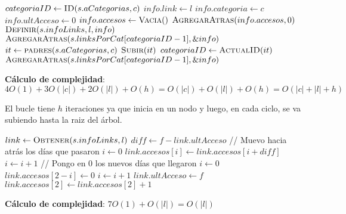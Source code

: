 \documentclass[10pt, a4paper]{article}
\let\TipoVariable=\texttt
\let\ModificadorArgumento=\textbf
\newcommand{\tab}{\hspace*{7mm}}
\newcommand{\In}[2]{\ModificadorArgumento{in} \ensuremath{#1}\,: \TipoVariable{#2}\xspace}
\newcommand{\Inout}[2]{\ModificadorArgumento{in/out} \ensuremath{#1}\,: \TipoVariable{#2}\xspace}
\begin{document}
\begin{algorithm}[H]
\caption*{iAgregarLink(\Inout{s}{LinkLinkIt}, \In{l}{link}, \In{c}{categoria})}
\begin{algorithmic}[1]
	\State $categoriaID \gets \Call{ID}{s.aCategorias, c}$
	\Statex
	\State $info.link \gets l$
	\State $info.categoria \gets c$
    \State $info.ultAcceso \gets 0$
    \State $info.accesos \gets \Call{Vacia}{\null}$
        \State $\Call{AgregarAtras}{info.accesos, 0}$
    \EndFor
	\State $\Call{Definir}{s.infoLinks, l, info}$
    \State $\Call{AgregarAtras}{s.linksPorCat[categoriaID-1], \&info}$
	\Statex
	\State $it \gets \Call{padres}{s.aCategorias, c}$
    	\State $\Call{Subir}{it}$
    	\State $categoriaID \gets \Call{ActualID}{it}$
		\State $\Call{AgregarAtras}{s.linksPorCat[categoriaID-1], \&info}$
	\EndWhile
\end{algorithmic}
\textbf{C\'alculo de complejidad}: $4O(1) + 3O(|c|) + 2O(|l|) + O(h) = O(|c|) + O(|l|) + O(h) = O(|c| + |l| + h)$
\par \tab El bucle tiene $h$ iteraciones ya que inicia en un nodo y luego, en cada ciclo, se va subiendo hasta la raiz del \'arbol.
\end{algorithm}

\begin{algorithm}[H]
\caption*{iAccederLink(\Inout{s}{LinkLinkIt}, \In{l}{link}, \In{f}{fecha})}
\begin{algorithmic}[1]
	\State $link \gets \Call{Obtener}{s.infoLinks, l}$
    \State $diff \gets f - link.ultAcceso$
    \Statex
    \Statex // Muevo hacia atr\'as los d\'ias que pasaron
    \State $i \gets 0$
        \State $link.accesos[i] \gets link.accesos[i + diff]$
        \State $i \gets i + 1$
    \EndWhile
    \Statex
    \Statex // Pongo en 0 los nuevos d\'ias que llegaron
    \State $i \gets 0$
        \State $link.accesos[2 - i] \gets 0$
        \State $i \gets i + 1$
    \EndWhile
    \Statex
    \State $link.ultAcceso \gets f$
    \State $link.accesos[2] \gets link.accesos[2] + 1$
\end{algorithmic}
\textbf{C\'alculo de complejidad}: $7O(1) + O(|l|) = O(|l|)$
\end{algorithm}
\end{document}
